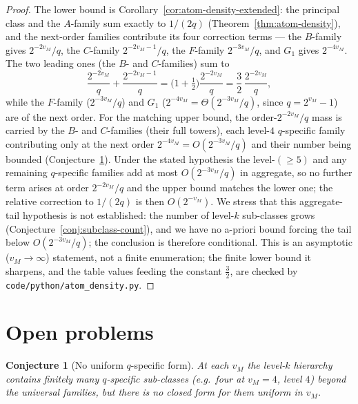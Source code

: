\documentclass[11pt,reqno]{amsart}
\theoremstyle{plain}
\newtheorem{conjecture}[theorem]{Conjecture}
\theoremstyle{definition}
\theoremstyle{remark}
\newcommand{\vM}{v_{M}}
\newcommand{\srcpath}[1]{\nolinkurl{#1}}
\begin{document}
\begin{proof}
The lower bound is Corollary~\ref{cor:atom-density-extended}: the principal
class and the $A$-family sum exactly to $1/(2q)$
(Theorem~\ref{thm:atom-density}), and the next-order families contribute its
four correction terms --- the $B$-family gives $2^{-2\vM}/q$, the $C$-family
$2^{-2\vM - 1}/q$, the $F$-family $2^{-3\vM}/q$, and $G_1$ gives $2^{-4\vM}$.
The two leading ones (the $B$- and $C$-families) sum to
\[
\frac{2^{-2\vM}}{q} + \frac{2^{-2\vM - 1}}{q}
  = \Big(1 + \tfrac12\Big)\frac{2^{-2\vM}}{q}
  = \frac{3}{2}\,\frac{2^{-2\vM}}{q},
\]
while the $F$-family ($2^{-3\vM}/q$) and $G_1$ ($2^{-4\vM} =
\Theta(2^{-3\vM}/q)$, since $q = 2^{\vM} - 1$) are of the next order. For the matching upper bound, the
order-$2^{-2\vM}/q$ mass is carried by the $B$- and $C$-families (their full
towers), each level-$4$ $q$-specific family contributing only at the next order
$2^{-4\vM} = O(2^{-3\vM}/q)$ and their number being bounded
(Conjecture~\ref{conj:qspecific}). Under the stated hypothesis the level-$(\ge 5)$ and any
remaining $q$-specific families add at most $O(2^{-3\vM}/q)$ in aggregate, so
no further term arises at order $2^{-2\vM}/q$ and the upper bound matches the
lower one; the relative correction to $1/(2q)$ is then $O(2^{-\vM})$. We stress
that this aggregate-tail hypothesis is not established: the number of level-$k$
sub-classes grows (Conjecture~\ref{conj:subclass-count}), and we have no
a-priori bound forcing the tail below $O(2^{-3\vM}/q)$; the conclusion is
therefore conditional. This is an asymptotic ($\vM \to \infty$) statement, not
a finite enumeration; the finite lower bound it sharpens, and the table values
feeding the constant $\tfrac32$, are checked by
\srcpath{code/python/atom\_density.py}.
\end{proof}

\section{Open problems}\label{sec:open}

\begin{conjecture}[No uniform $q$-specific form]\label{conj:qspecific}
At each $\vM$ the level-$k$ hierarchy contains finitely many $q$-specific
sub-classes (e.g.\ four at $\vM = 4$, level $4$) beyond the universal
families, but there is no closed form for them uniform in $\vM$.
\end{conjecture}
\end{document}
